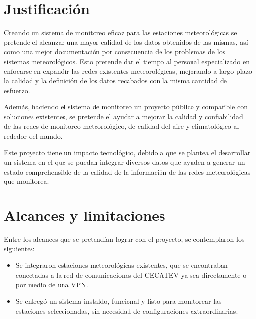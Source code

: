 \section{Justificación}

Creando un sistema de monitoreo eficaz para las estaciones meteorológicas se pretende el alcanzar una mayor calidad de los datos obtenidos de las mismas, así como una mejor documentación por consecuencia de los problemas de los sistemas meteorológicos. Esto pretende dar el tiempo al personal especializado en enfocarse en expandir las redes existentes meteorológicas, mejorando a largo plazo la calidad y la definición de los datos recabados con la misma cantidad de esfuerzo.

Además, haciendo el sistema de monitoreo un proyecto público y compatible con soluciones existentes, se pretende el ayudar a mejorar la calidad y confiabilidad de las redes de monitoreo meteorológico, de calidad del aire y climatológico al rededor del mundo.

Este proyecto tiene un impacto tecnológico, debido a que se plantea el desarrollar un sistema en el que se puedan integrar diversos datos que ayuden a generar un estado comprehensible de la calidad de la información de las redes meteorológicas que monitorea.





\section{Alcances y limitaciones}

Entre los alcances que se pretendían lograr con el proyecto, se contemplaron los siguientes:

\begin{itemize}

   \item Se integraron estaciones meteorológicas existentes, que se encontraban conectadas a la red de comunicaciones del CECATEV ya sea directamente o por medio de una VPN.

   \item Se entregó un sistema instaldo, funcional y listo para monitorear las estaciones seleccionadas, sin necesidad de configuraciones extraordinarias.

\end{itemize}

